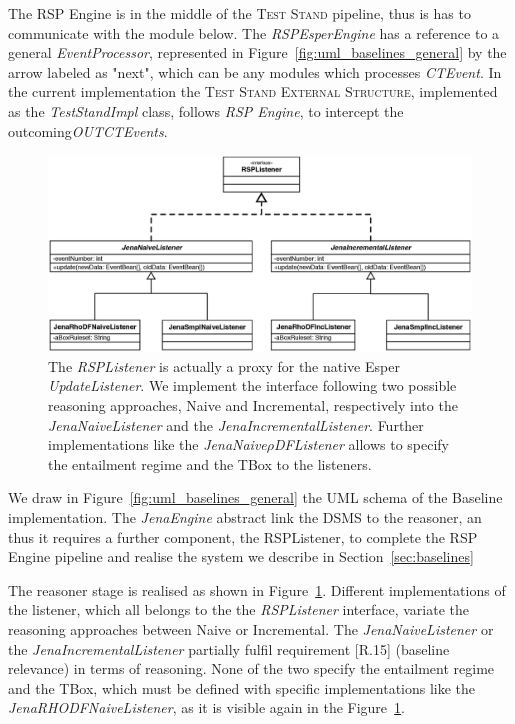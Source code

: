 The RSP Engine is in the middle of the \textsc{Test Stand} pipeline, thus is has to communicate with the module below. The \textit{RSPEsperEngine} has a reference to a general \textit{EventProcessor}, represented in Figure~\ref{fig:uml_baselines_general}  by the arrow labeled as "next", which can be any modules which processes \textit{CTEvent}. In the current implementation the \textsc{Test Stand External Structure}, implemented as the \textit{TestStandImpl} class, follows \textit{RSP Engine}, to intercept the outcoming\textit{OUTCTEvents}.

\begin{figure}[tbh]
  \centering
	\includegraphics[width=\linewidth]{images/uml_baselines_listener}
	\caption[\textit{RSPListener} Implementations - UML Schema]{The \textit{RSPListener} is actually a proxy for the native Esper \textit{UpdateListener}. We implement the interface following two possible reasoning approaches, Naive and Incremental, respectively into the  \textit{JenaNaiveListener} and the \textit{JenaIncrementalListener}. Further implementations like the \textit{JenaNaive$\rho$DFListener} allows to specify the entailment regime and the TBox to the listeners.} 
  	\label{fig:uml_baselines_listener}
\end{figure}

We draw in Figure~\ref{fig:uml_baselines_general} the UML schema of the Baseline implementation. The \textit{JenaEngine} abstract link the DSMS to the reasoner, an thus it requires a further component, the RSPListener, to complete the RSP Engine pipeline and realise the system we describe in Section~\ref{sec:baselines}
 
The reasoner stage is realised as shown in Figure~\ref{fig:uml_baselines_listener}. Different implementations of the listener, which all belongs to the the \textit{RSPListener} interface, variate the reasoning approaches between Naive or Incremental. The \textit{JenaNaiveListener} or the \textit{JenaIncrementalListener} partially fulfil requirement [R.15] (baseline relevance) in terms of reasoning. None of the two specify the entailment regime and the TBox, which must be defined with specific implementations like the \textit{JenaRHODFNaiveListener}, as it is visible again in the Figure~\ref{fig:uml_baselines_listener}.

